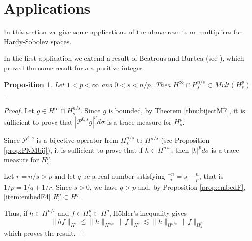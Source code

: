 \documentclass[12pt,twoside,leqno,final]{amsart}
\theoremstyle{plain}
\newtheorem{prop}[thm]{Proposition}
\begin{document}
\section{Applications}\label{sec:applications}

In this section we give some  applications of the above results on multipliers for Hardy-Sobolev spaces. 

            
               
In the first application we extend a result of Beatrous and Burbea (see \cite{beatrousburbea2}), which proved the same result for $s$ a positive integer.
\begin{prop}
Let  $1<p<\infty$ and $0<s<n/p$.  Then $H^\infty\cap H^{n/s}_s\subset Mult(H^p_s)$.
\end{prop}

\begin{proof}
Let $g\in  H^\infty\cap H^{n/s}_s$.
Since $g$ is bounded, by Theorem \ref{thm:bijectMF}, it is sufficient to prove that $|{{\mathcal P}}^{0,s} g|^pd\sigma$ 
is a trace measure for $H^p_s$.

Since ${{\mathcal P}}^{0,s}$ is a bijective operator from $H^{n/s}_s$ to $H^{n/s}$ (see Proposition \ref{prop:PNMbij}), it is sufficient to prove that if $h\in H^{n/s}$, then 
$|h|^pd\sigma$ is a trace measure for $H^p_s$.

Let  $r=n/s>p$ and let $q$ be a real number satisfying $\frac{-n}{q}=s-\frac{n}{p}$, that is $1/p=1/q+1/r$. 
Since $s>0$, we have $q>p$ and, by Proposition \ref{prop:embedF}, \eqref{item:embedF4} $H^p_s\subset H^q$. 

Thus, if $h\in H^{n/s}$ and $f\in H^p_s\subset H^q$, H\"older's inequality gives 
$$
\|hf\|_{H^p}\le \|h\|_{H^{n/s}}\, \|f\|_{H^q}\lesssim \|h\|_{H^{n/s}}\, \|f\|_{H^p_s}
$$ 
which proves the result.
\end{proof}
\end{document}
